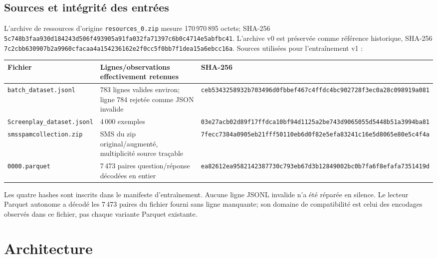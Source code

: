 \documentclass[11pt,a4paper,openany]{book}
\begin{document}
\section{Sources et intégrité des entrées}
L'archive de ressources d'origine \texttt{resources\_0.zip} mesure 170\,970\,895 octets; SHA-256 \texttt{5c748b3faa930d184243d506f493905a91fa032fa71397c6b0c4714e5abfbc41}. L'archive v0 est préservée comme référence historique, SHA-256 \texttt{7c2cbb630907b2a9960cfacaa4a154236162e2f0cc5f0bb7f1dea15a6ebcc16a}. Sources utilisées pour l'entraînement v1 :
\begin{center}\begin{tabular}{lll}\toprule Fichier & Lignes/observations effectivement retenues & SHA-256\\\midrule
\texttt{batch\_dataset.jsonl} & 783 lignes valides environ; ligne 784 rejetée comme JSON invalide & \texttt{ceb5343258932b703496d0fbbef467c4ffdc4bc902728f3ec0a28c098919a081}\\
\texttt{Screenplay\_dataset.jsonl} & 4\,000 exemples & \texttt{03e27acb02d89f17ffdca10bf94d1125a2be743d9065055d5448b51a3994ba81}\\
\texttt{smsspamcollection.zip} & SMS du zip original/augmenté, multiplicité source traçable & \texttt{7fecc7384a0905eb21fff50110eb6d0f82e5efa83241c16e5d8065e80e5c4f4a}\\
\texttt{0000.parquet} & 7\,473 paires question/réponse décodées en entier & \texttt{ea82612ea9582142387730c793eb67d3b12849002bc0b7fa6f8efafa7351419d}\\\bottomrule\end{tabular}\end{center}
Les quatre hashes sont inscrits dans le manifeste d'entraînement. Aucune ligne JSONL invalide n'a été réparée en silence. Le lecteur Parquet autonome a décodé les 7\,473 paires du fichier fourni sans ligne manquante; son domaine de compatibilité est celui des encodages observés dans ce fichier, pas chaque variante Parquet existante.

\chapter{Architecture}
\end{document}
